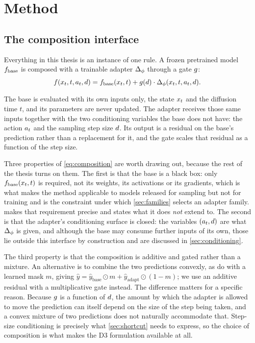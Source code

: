 \chapter{Method}
\label{ch:method}

\section{The composition interface}
\label{sec:composition}

Everything in this thesis is an instance of one rule. A frozen pretrained
model $f_{\mathrm{base}}$ is composed with a trainable adapter $\Delta_{\phi}$ through a
gate $g$:
\begin{equation}
  \label{eq:composition}
  f(x_t, t, a_t, d) = f_{\mathrm{base}}(x_t, t) + g(d)\cdot\Delta_{\phi}(x_t, t, a_t, d) .
\end{equation}

The base is evaluated with its own inputs only, the state $x_t$ and the
diffusion time $t$, and its parameters are never updated. The adapter
receives those same inputs together with the two conditioning variables the
base does not have: the action $a_t$ and the sampling step size $d$.
Its output is a residual on the base's prediction rather than a replacement
for it, and the gate scales that residual as a function of the step size.

Three properties of \cref{eq:composition} are worth drawing out, because the
rest of the thesis turns on them. The first is that the base is a black
box: only $f_{\mathrm{base}}(x_t,t)$ is required, not its weights, its activations or
its gradients, which is what makes the method applicable to models released
for sampling but not for training and is the constraint under which
\cref{sec:families} selects an adapter family. 
makes that requirement precise and states what it does \emph{not} extend
to. The second is that the adapter's conditioning surface is closed: the
variables $(a_t, d)$ are what $\Delta_{\phi}$ is given, and although the
base may consume further inputs of its own, those lie outside this
interface by construction and are discussed in \cref{sec:conditioning}.

The third property is that the composition is additive and gated rather
than a mixture. An alternative is to combine the two predictions convexly,
as \citet{rigter2024avid} do with a learned mask $m$, giving
$\hat{y} = \hat{y}_{\text{base}} \odot m + \hat{y}_{\text{adapt}} \odot
(1-m)$; we use an additive residual with a multiplicative gate instead. The
difference matters for a specific reason. Because $g$ is a function of
$d$, the amount by which the adapter is allowed to move the prediction
can itself depend on the size of the step being taken, and a convex mixture
of two predictions does not naturally accommodate that. Step-size
conditioning is precisely what \cref{sec:shortcut} needs to express, so the
choice of composition is what makes the D3 formulation available at all.

